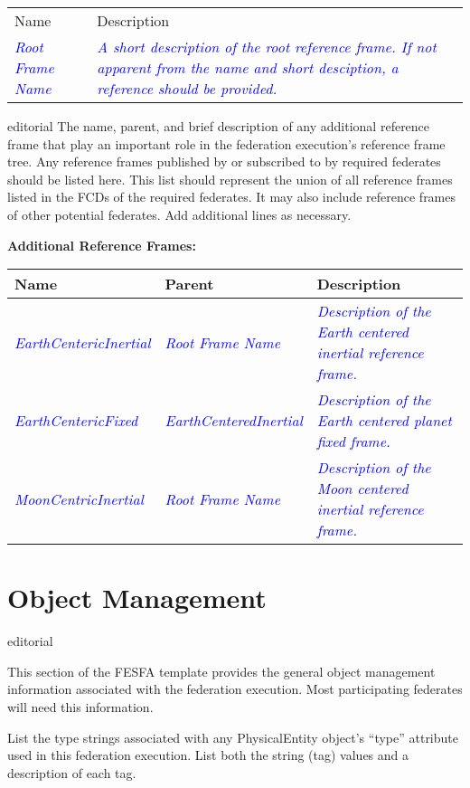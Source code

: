 \documentclass[11pt,english,letterpaper]{article}
\newcommand{\example}[1]{{\textcolor{blue}{\textit{#1}}}}
\begin{document}
\begin{tabularx}{\textwidth}{lX}
Name & Description \\
\example{Root Frame Name} &
\example{A short description of the root reference frame.  If not apparent from
the name and short desciption, a reference should be provided.\cite{vallado2001}}
\end{tabularx}

\begin{shownto}{editorial}
{\color{red} The name, parent, and brief description of any additional reference
frame that play an important role in the federation execution’s reference frame
tree. Any reference frames published by or subscribed to by required federates
should be listed here. This list should represent the union of all reference
frames listed in the FCDs of the required federates. It may also include
reference frames of other potential federates. Add additional lines as
necessary.}
\end{shownto}

\textbf{Additional Reference Frames: }

\begin{tabularx}{\textwidth}{|l|l|X|} \hline
Name & Parent & Description \\ \hline
\example{EarthCentericInertial} &
\example{Root Frame Name} &
\example{Description of the Earth centered inertial reference frame.} \\ \hline
\example{EarthCentericFixed} &
\example{EarthCenteredInertial} &
\example{Description of the Earth centered planet fixed frame.} \\ \hline
\example{MoonCentricInertial} &
\example{Root Frame Name} &
\example{Description of the Moon centered inertial reference frame.} \\ \hline
\end{tabularx}

\section*{Object Management}

\begin{shownto}{editorial}
{\color{red} This section of the FESFA template provides the general object
management information associated with the federation execution. Most
participating federates will need this information.

List the type strings associated with any PhysicalEntity object’s “type”
attribute used in this federation execution. List both the string (tag) values
and a description of each tag.}
\end{shownto}
\end{document}
